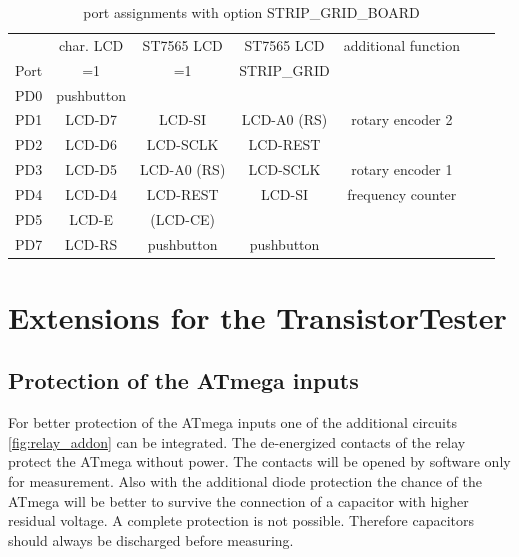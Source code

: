 \begin{table}[H]
  \begin{center}
    \begin{tabular}{| c || c | c | c | c | c | c |}
    \hline
           & char. LCD    & ST7565 LCD & ST7565 LCD    & additional function \\
      Port &   =1         &   =1       & STRIP\_GRID   & \\
    \hline
    \hline
    PD0    &  pushbutton  &              &             & \\
    \hline
    PD1    &  LCD-D7      &  LCD-SI      & LCD-A0 (RS) &  rotary encoder 2  \\
    \hline
    PD2    &  LCD-D6      &  LCD-SCLK    & LCD-REST    & \\
    \hline
    PD3    &  LCD-D5      &  LCD-A0 (RS) & LCD-SCLK    & rotary encoder 1 \\
    \hline
    PD4    &  LCD-D4      &  LCD-REST    & LCD-SI      & frequency counter \\
    \hline
    PD5    &  LCD-E       &  (LCD-CE)    &             & \\
    \hline
    PD7    &  LCD-RS      &  pushbutton  & pushbutton  & \\
    \hline
    \end{tabular}
  \end{center}
  \caption{port assignments with option STRIP\_GRID\_BOARD}
  \label{tab:grid-change}
\end{table}

\section {Extensions for the TransistorTester}

\subsection{Protection of the ATmega inputs}

For better protection of the ATmega inputs one of the additional circuits~ \ref{fig:relay_addon} 
can be integrated. The de-energized contacts of the relay protect the ATmega without power.
The contacts will be opened by software only for measurement.
Also with the additional diode protection the chance of the ATmega will be better to survive the connection
of a capacitor with higher residual voltage.
A complete protection is not possible. Therefore capacitors should always be discharged before measuring.

